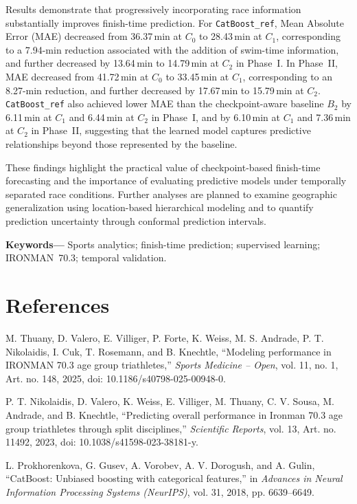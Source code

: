 \documentclass[10pt,a4paper,onecolumn]{article}
\begin{document}
Results demonstrate that progressively incorporating race information substantially improves finish-time prediction. For \texttt{CatBoost\_ref}, Mean Absolute Error (MAE) decreased from 36.37\,min at $C_0$ to 28.43\,min at $C_1$, corresponding to a 7.94-min reduction associated with the addition of swim-time information, and further decreased by 13.64\,min to 14.79\,min at $C_2$ in Phase~I. In Phase~II, MAE decreased from 41.72\,min at $C_0$ to 33.45\,min at $C_1$, corresponding to an 8.27-min reduction, and further decreased by 17.67\,min to 15.79\,min at $C_2$. \texttt{CatBoost\_ref} also achieved lower MAE than the checkpoint-aware baseline $B_2$ by 6.11\,min at $C_1$ and 6.44\,min at $C_2$ in Phase~I, and by 6.10\,min at $C_1$ and 7.36\,min at $C_2$ in Phase~II, suggesting that the learned model captures predictive relationships beyond those represented by the baseline.

These findings highlight the practical value of checkpoint-based finish-time forecasting and the importance of evaluating predictive models under temporally separated race conditions. Further analyses are planned to examine geographic generalization using location-based hierarchical modeling and to quantify prediction uncertainty through conformal prediction intervals.

\medskip
\noindent\textbf{Keywords---} Sports analytics; finish-time prediction; supervised learning; IRONMAN~70.3; temporal validation.

\section*{References}
\begin{enumerate}[label={[\arabic*]},leftmargin=*,itemsep=1pt]
\item M. Thuany, D. Valero, E. Villiger, P. Forte, K. Weiss, M. S. Andrade, P. T. Nikolaidis, I. Cuk, T. Rosemann, and B. Knechtle, ``Modeling performance in IRONMAN 70.3 age group triathletes,'' \emph{Sports Medicine -- Open}, vol. 11, no. 1, Art. no. 148, 2025, doi: 10.1186/s40798-025-00948-0.
\item P. T. Nikolaidis, D. Valero, K. Weiss, E. Villiger, M. Thuany, C. V. Sousa, M. Andrade, and B. Knechtle, ``Predicting overall performance in Ironman 70.3 age group triathletes through split disciplines,'' \emph{Scientific Reports}, vol. 13, Art. no. 11492, 2023, doi: 10.1038/s41598-023-38181-y.
\item L. Prokhorenkova, G. Gusev, A. Vorobev, A. V. Dorogush, and A. Gulin, ``CatBoost: Unbiased boosting with categorical features,'' in \emph{Advances in Neural Information Processing Systems (NeurIPS)}, vol. 31, 2018, pp. 6639--6649.
\end{enumerate}
\end{document}
